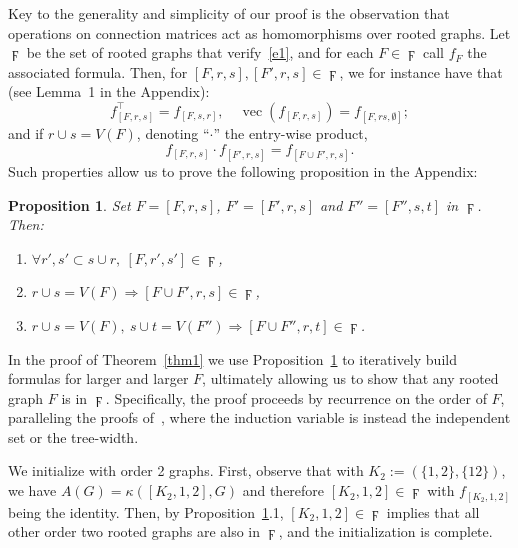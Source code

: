 \documentclass{article}
\theoremstyle{plain}
\newtheorem{Proposition}{Proposition}
\DeclareMathOperator{\vect}{vec}
\begin{document}
Key to the generality and simplicity of our proof is the observation that operations on connection matrices act as homomorphisms over rooted graphs. Let $\digamma$ be the set of rooted graphs that verify~\eqref{e1}, and for each $F\in\digamma$ call $f_F$ the associated formula. Then, for $[F,r,s], [F',r,s]\in\digamma$, we for instance have that (see Lemma~1 in the Appendix):
\begin{equation}\label{trans}
f_{[F,r,s]}^\top = f_{[F,s,r]},\quad
\vect(f_{[F,r,s]}) = f_{[F,rs,\emptyset]};
\end{equation}
and if $r\cup s=V(F)$, denoting ``$\cdot$'' the entry-wise product,
\begin{equation}\label{hada}
f_{[F,r,s]}\cdot f_{[F',r,s]} = f_{[F\cup F',r,s]}.
\end{equation}
Such properties allow us to prove the following proposition in the Appendix:
\vspace{-.05\baselineskip}\begin{Proposition}\label{hp}
Set $F=[F,r,s]$, $F' = [F',r,s]$ and $F''=[F'',s,t]$ in $\digamma$. Then:\vspace{-.3\baselineskip}
\begin{enumerate}\itemsep0em
\item $\forall r',s'\subset s\cup r,\ [F,r',s']\in\digamma$,
\item $r\cup s=V(F)\Rightarrow
[F\cup F',r,s]\in\digamma$,
\item $r\cup s=V(F),\ s\cup t = V(F'')\Rightarrow
[F\cup F'',r,t]\in\digamma$.
\end{enumerate}
\end{Proposition}\vspace{-.3\baselineskip}

In the proof of Theorem~\ref{thm1} we use Proposition~\ref{hp} to iteratively build formulas for larger and larger $F$, ultimately allowing us to show that any rooted graph $F$ is in $\digamma$. Specifically, the proof proceeds by recurrence on the order of $F$, paralleling the proofs of~\cite{chiba1985arboricity,meeks2016tree,nevsetvril2012sparsity,kowaluk2013counting,demaine2014structural}, where the induction variable is instead the independent set or the tree-width.

We initialize with order 2 graphs. First, observe that with $K_2:=(\{1,2\},\{12\})$, we have $A(G)=\kappa([K_2,1,2],G)$ and therefore $[K_2,1,2]\in\digamma$ with $f_{[K_2,1,2]}$ being the identity. Then, by Proposition~\ref{hp}.1, $[K_2,1,2]\in\digamma$ implies that all other order two rooted graphs are also in $\digamma$, and the initialization is complete. 
\end{document}
